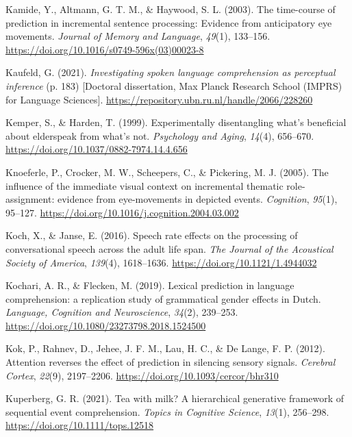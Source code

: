 \documentclass[a4paper, nobind]{templates/ociamthesis}
\newlength{\cslhangindent}
\newenvironment{CSLReferences}[2] %
 {%
  \setlength{\parindent}{0pt}
  \ifodd #1
  \let\oldpar\par
  \def\par{\hangindent=\cslhangindent\oldpar}
  \fi
  \setlength{\parskip}{1mm}
  \setlength{\baselineskip}{6mm}
 }%
 {}
\begin{document}
\begin{CSLReferences}{1}{0}
\leavevmode{}%
Kamide, Y., Altmann, G. T. M., \& Haywood, S. L. (2003). The time-course of prediction in incremental sentence processing: Evidence from anticipatory eye movements. \emph{Journal of Memory and Language}, \emph{49}(1), 133--156. \url{https://doi.org/10.1016/s0749-596x(03)00023-8}

\leavevmode{}%
Kaufeld, G. (2021). \emph{Investigating spoken language comprehension as perceptual inference} (p. 183) {[}Doctoral dissertation, Max Planck Research School (IMPRS) for Language Sciences{]}. \url{https://repository.ubn.ru.nl/handle/2066/228260}

\leavevmode{}%
Kemper, S., \& Harden, T. (1999). {Experimentally disentangling what's beneficial about elderspeak from what's not}. \emph{Psychology and Aging}, \emph{14}(4), 656--670. \url{https://doi.org/10.1037/0882-7974.14.4.656}

\leavevmode{}%
Knoeferle, P., Crocker, M. W., Scheepers, C., \& Pickering, M. J. (2005). The influence of the immediate visual context on incremental thematic role-assignment: evidence from eye-movements in depicted events. \emph{Cognition}, \emph{95}(1), 95--127. \url{https://doi.org/10.1016/j.cognition.2004.03.002}

\leavevmode{}%
Koch, X., \& Janse, E. (2016). {Speech rate effects on the processing of conversational speech across the adult life span}. \emph{The Journal of the Acoustical Society of America}, \emph{139}(4), 1618--1636. \url{https://doi.org/10.1121/1.4944032}

\leavevmode{}%
Kochari, A. R., \& Flecken, M. (2019). {Lexical prediction in language comprehension: a replication study of grammatical gender effects in Dutch}. \emph{Language, Cognition and Neuroscience}, \emph{34}(2), 239--253. \url{https://doi.org/10.1080/23273798.2018.1524500}

\leavevmode{}%
Kok, P., Rahnev, D., Jehee, J. F. M., Lau, H. C., \& De Lange, F. P. (2012). {Attention reverses the effect of prediction in silencing sensory signals}. \emph{Cerebral Cortex}, \emph{22}(9), 2197--2206. \url{https://doi.org/10.1093/cercor/bhr310}

\leavevmode{}%
Kuperberg, G. R. (2021). {Tea with milk? A hierarchical generative framework of sequential event comprehension}. \emph{Topics in Cognitive Science}, \emph{13}(1), 256--298. \url{https://doi.org/10.1111/tops.12518}


\end{CSLReferences}
\end{document}
